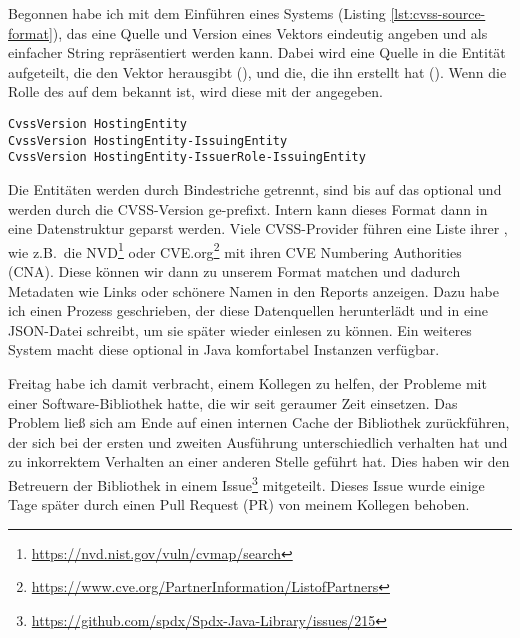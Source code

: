 Begonnen habe ich mit dem Einführen eines Systems (Listing \ref{lst:cvss-source-format}), das eine Quelle und Version eines Vektors eindeutig angeben und als einfacher String repräsentiert werden kann.
Dabei wird eine Quelle in die Entität aufgeteilt, die den Vektor herausgibt (), und die, die ihn erstellt hat ().
Wenn die Rolle des  auf dem  bekannt ist, wird diese mit der  angegeben.

\begin{lstlisting}[language={}, label={lst:cvss-source-format}, caption={CVSS Sources Format}]
CvssVersion HostingEntity
CvssVersion HostingEntity-IssuingEntity
CvssVersion HostingEntity-IssuerRole-IssuingEntity
\end{lstlisting}

Die Entitäten werden durch Bindestriche getrennt, sind bis auf das  optional und werden durch die CVSS-Version ge-prefixt.
Intern kann dieses Format dann in eine Datenstruktur geparst werden.
Viele CVSS-Provider führen eine Liste ihrer , wie z.B.\ die NVD\footnote{\url{https://nvd.nist.gov/vuln/cvmap/search}} oder CVE.org\footnote{\url{https://www.cve.org/PartnerInformation/ListofPartners}} mit ihren CVE Numbering Authorities (CNA).
Diese können wir dann zu unserem Format matchen und dadurch Metadaten wie Links oder schönere Namen in den Reports anzeigen.
Dazu habe ich einen Prozess geschrieben, der diese Datenquellen herunterlädt und in eine JSON-Datei schreibt, um sie später wieder einlesen zu können.
Ein weiteres System macht diese optional in Java komfortabel Instanzen verfügbar.

\sweekdaymarginpar{\weekdayFridayLong}

Freitag habe ich damit verbracht, einem Kollegen zu helfen, der Probleme mit einer Software-Bibliothek hatte, die wir seit geraumer Zeit einsetzen.
Das Problem ließ sich am Ende auf einen internen Cache der Bibliothek zurückführen, der sich bei der ersten und zweiten Ausführung unterschiedlich verhalten hat und zu inkorrektem Verhalten an einer anderen Stelle geführt hat.
Dies haben wir den Betreuern der Bibliothek in einem Issue\footnote{\url{https://github.com/spdx/Spdx-Java-Library/issues/215}} mitgeteilt.
Dieses Issue wurde einige Tage später durch einen Pull Request (PR) von meinem Kollegen behoben.
